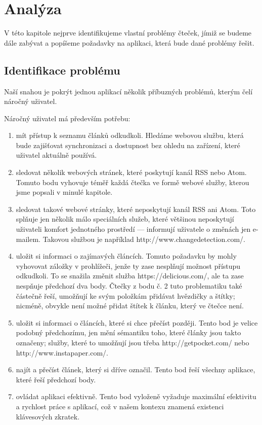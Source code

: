 \chapter{Analýza}

V této kapitole nejprve identifikujeme vlastní problémy čteček, jímiž se budeme dále zabývat a popíšeme požadavky na aplikaci, která bude dané problémy řešit.

\section{Identifikace problému}

Naší snahou je pokrýt jednou aplikací několik příbuzných problémů, kterým čelí náročný uživatel.

Náročný uživatel má především potřebu:
\begin{enumerate}
    \item mít přístup k seznamu článků odkudkoli.
        Hledáme webovou službu, která bude zajišťovat synchronizaci a dostupnost bez ohledu na zařízení, které uživatel aktuálně používá.
    \item sledovat několik webových stránek, které poskytují kanál RSS nebo Atom.
        Tomuto bodu vyhovuje téměř každá čtečka ve formě webové služby, kterou jsme popsali v minulé kapitole.
    \item sledovat takové webové stránky, které neposkytují kanál RSS ani Atom.
        Toto splňuje jen několik málo speciálních služeb, které většinou neposkytují uživateli komfort jednotného prostředí --- informují uživatele o změnách jen e-mailem.
		Takovou službou je například http://www.changedetection.com/.
    \item uložit si informaci o zajímavých článcích.
        Tomuto požadavku by mohly vyhovovat záložky v prohlížeči, jenže ty zase nesplňují možnost přístupu odkudkoli.
        To se snažila změnit služba https://delicious.com/, ale ta zase nespňuje předchozí dva body.
        Čtečky z bodu č. 2 tuto problematiku také částečně řeší, umožňují ke svým položkám přidávat hvězdičky a štítky; nicméně, obvykle není možné přidat štítek k článku, který ve čtečce není.
    \item uložit si informaci o článcích, které si chce přečíst později.
        Tento bod je velice podobný předchozímu, jen mění sémantiku toho, které články jsou takto označeny; služby, které to umožňují jsou třeba http://getpocket.com/ nebo http://www.instapaper.com/.
    \item najít a přečíst článek, který si dříve označil.
        Tento bod řeší všechny aplikace, které řeší předchozí body.
    \item ovládat aplikaci efektivně.
        Tento bod vyloženě vyžaduje maximální efektivitu a rychlost práce s aplikací, což v našem kontexu znamená existenci klávesových zkratek.
\end{enumerate}

